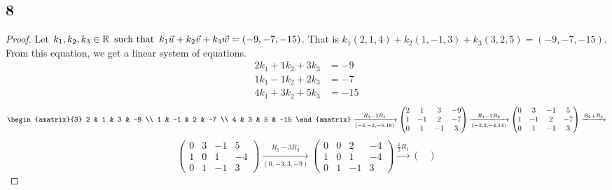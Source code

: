 \subsection*{8}
\begin{enumerate}
  \begin{proof}
    Let $k_1,k_2,k_3 \in \mathbb{R} \operatorname{~\text{such that}~} k_1\vec{u} + k_2\vec{v} + k_3\vec{w} = (-9,-7,-15)$. That is $k_1(2,1,4) + k_2(1,-1,3) + k_3(3,2,5) = (-9,-7,-15)$. From this equation, we get a linear system of equations.
    \begin{align*}
      2k_1 + 1k_2 + 3k_3 & = -9  \\
      1k_1 - 1k_2 + 2k_3 & = -7  \\
      4k_1 + 3k_2 + 5k_3 & = -15
    \end{align*}
    \[
      \begin{amatrix}{3}
        2 & 1 & 3 & -9 \\
        1 & -1 & 2 & -7 \\
        4 & 3 & 5 & -15
      \end{amatrix} \xrightarrow[(-4,-2,-6,18)]{R_3 - 2R_1}
      \begin{pmatrix}
        2 & 1  & 3  & -9 \\
        1 & -1 & 2  & -7 \\
        0 & 1  & -1 & 3
      \end{pmatrix} \xrightarrow[(-2,2,-4,14)]{R_1 - 2R_2}
      \begin{pmatrix}
        0 & 3  & -1 & 5  \\
        1 & -1 & 2  & -7 \\
        0 & 1  & -1 & 3
      \end{pmatrix} \xrightarrow{R_2 + R_3}
    \]
    \[
      \begin{pmatrix}
        0 & 3 & -1 & 5  \\
        1 & 0 & 1  & -4 \\
        0 & 1 & -1 & 3
      \end{pmatrix} \xrightarrow[(0,-3,3,-9)]{R_1 - 3R_3}
      \begin{pmatrix}
        0 & 0 & 2  & -4 \\
        1 & 0 & 1  & -4 \\
        0 & 1 & -1 & 3
      \end{pmatrix} \xrightarrow{\frac{1}{2}R_1}
      \begin{pmatrix}

\end{pmatrix}\]
\end{proof}
\end{enumerate}
